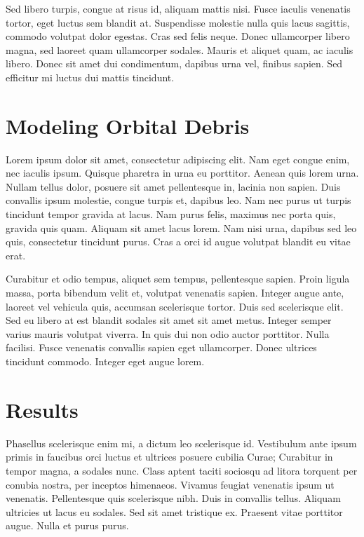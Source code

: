 \documentclass[12pt]{article}
\begin{document}
\begin{multicols*}{2}
Sed libero turpis, congue at risus id, aliquam mattis nisi. Fusce iaculis venenatis tortor, eget luctus sem blandit at. Suspendisse molestie nulla quis lacus sagittis, commodo volutpat dolor egestas. Cras sed felis neque. Donec ullamcorper libero magna, sed laoreet quam ullamcorper sodales. Mauris et aliquet quam, ac iaculis libero. Donec sit amet dui condimentum, dapibus urna vel, finibus sapien. Sed efficitur mi luctus dui mattis tincidunt.

\section{Modeling Orbital Debris} \label{systems}
Lorem ipsum dolor sit amet, consectetur adipiscing elit. Nam eget congue enim, nec iaculis ipsum. Quisque pharetra in urna eu porttitor. Aenean quis lorem urna. Nullam tellus dolor, posuere sit amet pellentesque in, lacinia non sapien. Duis convallis ipsum molestie, congue turpis et, dapibus leo. Nam nec purus ut turpis tincidunt tempor gravida at lacus. Nam purus felis, maximus nec porta quis, gravida quis quam. Aliquam sit amet lacus lorem. Nam nisi urna, dapibus sed leo quis, consectetur tincidunt purus. Cras a orci id augue volutpat blandit eu vitae erat.

Curabitur et odio tempus, aliquet sem tempus, pellentesque sapien. Proin ligula massa, porta bibendum velit et, volutpat venenatis sapien. Integer augue ante, laoreet vel vehicula quis, accumsan scelerisque tortor. Duis sed scelerisque elit. Sed eu libero at est blandit sodales sit amet sit amet metus. Integer semper varius mauris volutpat viverra. In quis dui non odio auctor porttitor. Nulla facilisi. Fusce venenatis convallis sapien eget ullamcorper. Donec ultrices tincidunt commodo. Integer eget augue lorem.

\section{Results} \label{applications}
Phasellus scelerisque enim mi, a dictum leo scelerisque id. Vestibulum ante ipsum primis in faucibus orci luctus et ultrices posuere cubilia Curae; Curabitur in tempor magna, a sodales nunc. Class aptent taciti sociosqu ad litora torquent per conubia nostra, per inceptos himenaeos. Vivamus feugiat venenatis ipsum ut venenatis. Pellentesque quis scelerisque nibh. Duis in convallis tellus. Aliquam ultricies ut lacus eu sodales. Sed sit amet tristique ex. Praesent vitae porttitor augue. Nulla et purus purus.


\end{multicols*}
\end{document}
